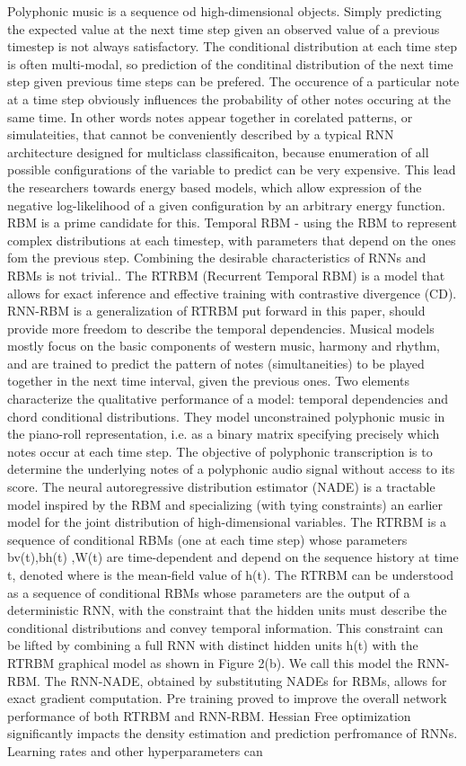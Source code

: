 \cite{Boulanger-Lewandowski2012} Polyphonic music is a sequence od high-dimensional objects. Simply predicting the expected value at the next time step given an observed value of a previous timestep is not always satisfactory. The conditional distribution at each time step is often multi-modal, so prediction of the conditinal distribution of the next time step given previous time steps can be prefered. The occurence of a particular note at a time step obviously influences the probability of other notes occuring at the same time. In other words notes appear together in corelated patterns, or simulateities, that cannot be conveniently described by a typical RNN architecture designed for multiclass classificaiton, because enumeration of all possible configurations of the variable to predict can be very expensive. This lead the researchers towards energy based models, which allow expression of the negative log-likelihood of a given configuration by an arbitrary energy function. RBM is a prime candidate for this. Temporal RBM - using the RBM to represent complex distributions at each timestep, with parameters that depend on the ones fom the previous step. Combining the desirable characteristics of RNNs and RBMs is not trivial.. The RTRBM (Recurrent Temporal RBM) is a model that allows for exact inference and effective training with contrastive divergence (CD). RNN-RBM is a generalization of RTRBM put forward in this paper, should provide more freedom to describe the temporal dependencies. Musical models mostly focus on the basic components of western music, harmony and rhythm, and are trained to predict the pattern of notes (simultaneities) to be played together in the next time interval, given the previous ones. Two elements characterize the qualitative performance of a model: temporal dependencies and chord conditional distributions. They model unconstrained polyphonic music in the piano-roll representation, i.e. as a binary matrix specifying precisely which notes occur at each time step. The objective of polyphonic transcription is to determine the underlying notes of a polyphonic audio signal without access to its score. The neural autoregressive distribution estimator (NADE) is a tractable model inspired by the RBM and specializing (with tying constraints) an earlier model for the joint distribution of high-dimensional variables. The RTRBM is a sequence of conditional RBMs (one at each time step) whose parameters bv(t),bh(t) ,W(t) are time-dependent and depend on the sequence history at time t, denoted where is the mean-field value of h(t). The RTRBM can be understood as a sequence of conditional RBMs whose parameters are the output of a deterministic RNN, with the constraint that the hidden units must describe the conditional distributions and convey temporal information. This constraint can be lifted by combining a full RNN with distinct hidden units h(t) with the RTRBM graphical model as shown in Figure 2(b). We call this model the RNN-RBM. The RNN-NADE, obtained by substituting NADEs for RBMs, allows for exact gradient computation. Pre training proved to improve the overall network performance of both RTRBM and RNN-RBM. Hessian Free optimization significantly impacts the density estimation and prediction perfromance of RNNs. Learning rates and other hyperparameters can 